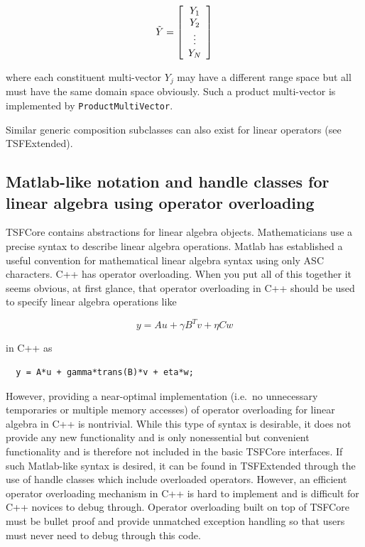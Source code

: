 \[
\tilde{Y} = {\bmat{c} Y_1 \\ Y_2 \\ \vdots \\ Y_N \emat}
\]

where each constituent multi-vector $Y_j$ may have a different range
space but all must have the same domain space obviously.  Such a
product multi-vector is implemented by
{}\texttt{Product\-Multi\-Vector}.

Similar generic composition subclasses can also exist for linear
operators (see TSFExtended).

%
\subsection{Matlab-like notation and handle classes for linear algebra
using operator overloading}
\label{tsfcore:sec:operator_overloading}
%

TSFCore contains abstractions for linear algebra objects.
Mathematicians use a precise syntax to describe linear algebra
operations.  Matlab {}\cite{ref:matlab} has established a useful
convention for mathematical linear algebra syntax using only ASC
characters.  C++ has operator overloading.  When you put all of this
together it seems obvious, at first glance, that operator overloading
in C++ should be used to specify linear algebra operations like

\[
y = A u + \gamma B^T v + \eta C w
\]

{}\noindent{}in C++ as

\begin{verbatim}
  y = A*u + gamma*trans(B)*v + eta*w;
\end{verbatim}

{}\noindent{}However, providing a near-optimal implementation (i.e.~no
unnecessary temporaries or multiple memory accesses) of operator
overloading for linear algebra in C++ is nontrivial.  While this type
of syntax is desirable, it does not provide any new functionality and
is only nonessential but convenient functionality and is therefore not
included in the basic TSFCore interfaces.  If such Matlab-like syntax
is desired, it can be found in TSFExtended through the use of handle
classes which include overloaded operators.  However, an efficient
operator overloading mechanism in C++ is hard to implement and is
difficult for C++ novices to debug through.  Operator overloading
built on top of TSFCore must be bullet proof and provide unmatched
exception handling so that users must never need to debug through this
code.

